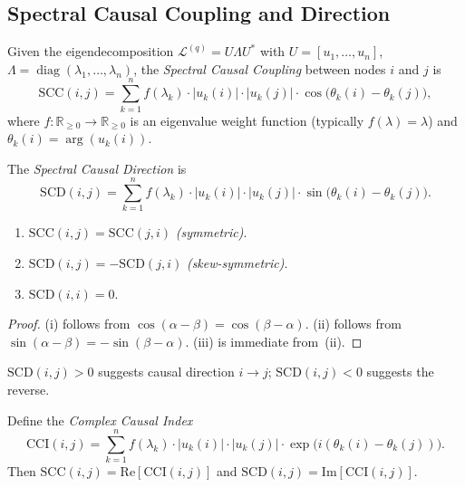 \documentclass[twoside,11pt]{article}
\DeclareMathOperator{\diag}{diag}
\newcommand{\R}{\mathbb{R}}
\newcommand{\SCC}{\mathrm{SCC}}
\newcommand{\SCD}{\mathrm{SCD}}
\newcommand{\CCI}{\mathrm{CCI}}
\begin{document}
\subsection{Spectral Causal Coupling and Direction}

\begin{definition}
\label{def:scc}
Given the eigendecomposition
$\mathcal{L}^{(q)}=U\Lambda U^*$ with
$U=[u_1,\dots,u_n]$, $\Lambda=\diag(\lambda_1,\dots,\lambda_n)$,
the \emph{Spectral Causal Coupling} between nodes $i$ and $j$ is
\begin{equation}
\label{eq:scc}
  \SCC(i,j) = \sum_{k=1}^n f(\lambda_k)\cdot|u_k(i)|\cdot|u_k(j)|
    \cdot\cos\!\bigl(\theta_k(i)-\theta_k(j)\bigr),
\end{equation}
where $f:\R_{\ge 0}\to\R_{\ge 0}$ is an eigenvalue weight function
(typically $f(\lambda)=\lambda$) and
$\theta_k(i)=\arg(u_k(i))$.
\end{definition}

\begin{definition}
\label{def:scd}
The \emph{Spectral Causal Direction} is
\begin{equation}
\label{eq:scd}
  \SCD(i,j) = \sum_{k=1}^n f(\lambda_k)\cdot|u_k(i)|\cdot|u_k(j)|
    \cdot\sin\!\bigl(\theta_k(i)-\theta_k(j)\bigr).
\end{equation}
\end{definition}

\begin{proposition}
\label{prop:symmetry}
\begin{enumerate}
\item[\emph{(i)}] $\SCC(i,j)=\SCC(j,i)$ \emph{(symmetric)}.
\item[\emph{(ii)}] $\SCD(i,j)=-\SCD(j,i)$ \emph{(skew-symmetric)}.
\item[\emph{(iii)}] $\SCD(i,i)=0$.
\end{enumerate}
\end{proposition}

\begin{proof}
(i) follows from $\cos(\alpha-\beta)=\cos(\beta-\alpha)$.
(ii) follows from $\sin(\alpha-\beta)=-\sin(\beta-\alpha)$.
(iii) is immediate from~(ii).
\end{proof}

$\SCD(i,j)>0$ suggests causal direction $i\to j$; $\SCD(i,j)<0$ suggests
the reverse.

\begin{theorem}
\label{thm:cci}
Define the \emph{Complex Causal Index}
\begin{equation}
\label{eq:cci}
  \CCI(i,j) = \sum_{k=1}^n f(\lambda_k)\cdot|u_k(i)|\cdot|u_k(j)|
    \cdot\exp\!\bigl(i(\theta_k(i)-\theta_k(j))\bigr).
\end{equation}
Then $\SCC(i,j)=\mathrm{Re}[\CCI(i,j)]$ and
$\SCD(i,j)=\mathrm{Im}[\CCI(i,j)]$.
\end{theorem}
\end{document}
